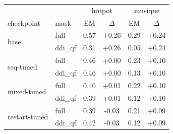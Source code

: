 \begin{tabular}{llcc cc}
\toprule
 & & \multicolumn{2}{c}{hotpot} & \multicolumn{2}{c}{musique} \\
checkpoint & mask & EM & $\Delta$ & EM & $\Delta$ \\
\midrule
\multirow{2}{*}{base} & full & 0.57 & +0.26 & 0.29 & +0.24 \\
 & ddi\_qf & 0.31 & +0.26 & 0.05 & +0.24 \\
\midrule
\multirow{2}{*}{seq-tuned} & full & 0.46 & +0.00 & 0.23 & +0.10 \\
 & ddi\_qf & 0.46 & +0.00 & 0.13 & +0.10 \\
\midrule
\multirow{2}{*}{mixed-tuned} & full & 0.40 & +0.01 & 0.22 & +0.10 \\
 & ddi\_qf & 0.39 & +0.01 & 0.12 & +0.10 \\
\midrule
\multirow{2}{*}{restart-tuned} & full & 0.39 & -0.03 & 0.21 & +0.09 \\
 & ddi\_qf & 0.42 & -0.03 & 0.12 & +0.09 \\
\bottomrule
\end{tabular}
